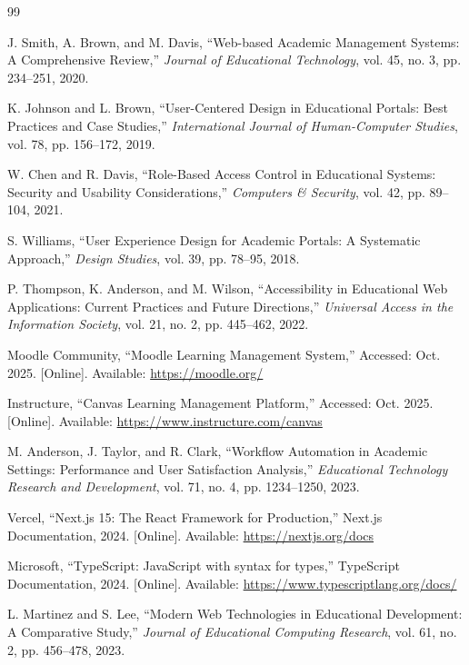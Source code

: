 \documentclass[conference]{IEEEtran}
\begin{document}
\begin{thebibliography}{99}

J. Smith, A. Brown, and M. Davis, ``Web-based Academic Management Systems: A Comprehensive Review,'' \emph{Journal of Educational Technology}, vol. 45, no. 3, pp. 234--251, 2020.

K. Johnson and L. Brown, ``User-Centered Design in Educational Portals: Best Practices and Case Studies,'' \emph{International Journal of Human-Computer Studies}, vol. 78, pp. 156--172, 2019.

W. Chen and R. Davis, ``Role-Based Access Control in Educational Systems: Security and Usability Considerations,'' \emph{Computers \& Security}, vol. 42, pp. 89--104, 2021.

S. Williams, ``User Experience Design for Academic Portals: A Systematic Approach,'' \emph{Design Studies}, vol. 39, pp. 78--95, 2018.

P. Thompson, K. Anderson, and M. Wilson, ``Accessibility in Educational Web Applications: Current Practices and Future Directions,'' \emph{Universal Access in the Information Society}, vol. 21, no. 2, pp. 445--462, 2022.

Moodle Community, ``Moodle Learning Management System,'' Accessed: Oct. 2025. [Online]. Available: \url{https://moodle.org/}

Instructure, ``Canvas Learning Management Platform,'' Accessed: Oct. 2025. [Online]. Available: \url{https://www.instructure.com/canvas}

M. Anderson, J. Taylor, and R. Clark, ``Workflow Automation in Academic Settings: Performance and User Satisfaction Analysis,'' \emph{Educational Technology Research and Development}, vol. 71, no. 4, pp. 1234--1250, 2023.

Vercel, ``Next.js 15: The React Framework for Production,'' Next.js Documentation, 2024. [Online]. Available: \url{https://nextjs.org/docs}

Microsoft, ``TypeScript: JavaScript with syntax for types,'' TypeScript Documentation, 2024. [Online]. Available: \url{https://www.typescriptlang.org/docs/}

L. Martinez and S. Lee, ``Modern Web Technologies in Educational Development: A Comparative Study,'' \emph{Journal of Educational Computing Research}, vol. 61, no. 2, pp. 456--478, 2023.


\end{thebibliography}
\end{document}

